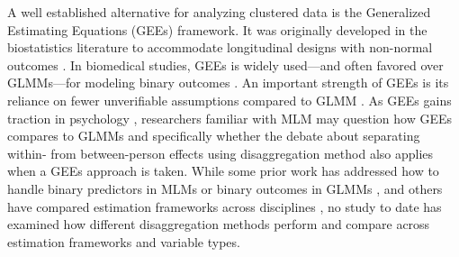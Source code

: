 \documentclass[stu]{apa7}
\begin{document}

A well established alternative for analyzing clustered data is the Generalized Estimating Equations (GEEs) framework. It was originally developed in the biostatistics literature to accommodate longitudinal designs with non-normal outcomes \parencite[]{liang_longitudinal_1986, zeger_longitudinal_1986}. In biomedical studies, GEEs is widely used—and often favored over GLMMs—for modeling binary outcomes \parencite[cf.][]{diggle_analysis_2002}. An important strength of GEEs is its reliance on fewer unverifiable assumptions compared to GLMM \parencite[]{mcneish_unnecessary_2017, hubbard_gee_2010}. As GEEs gains traction in psychology \parencite[e.g.,][]{mcneish_unnecessary_2017, muth_alternative_2016}, researchers familiar with MLM may question how GEEs compares to GLMMs and specifically whether the debate about separating within- from between-person effects using disaggregation method also applies when a GEEs approach is taken. While some prior work has addressed how to handle binary predictors in MLMs \parencite{yaremych_centering_2023, enders_centering_2007, raudenbush_hierarchical_2002} or binary outcomes in GLMMs \parencite{bolger_intensive_2013, schunck_within-_2017}, and others have compared estimation frameworks across disciplines \parencite{mcneish_unnecessary_2017, ballinger_using_2004, yan_comparing_2013, muth_alternative_2016, neuhaus_comparison_1991}, no study to date has examined how different disaggregation methods perform and compare across estimation frameworks and variable types. 

\end{document}
